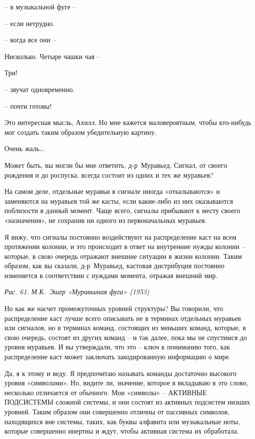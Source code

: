 \documentclass[../main.tex]{subfiles}
\begin{document}
\begin{dialogue}
 \--- в музыкальной фуге \---

 \--- если нетрудно.

 \--- когда все они \---

 Нисколько. Четыре чашки чая \---

 Три!

 \--- звучат одновременно.

 \--- почти готовы!

 Это интересная мысль, Ахилл. Но мне кажется маловероятным, чтобы кто-нибудь мог создать таким образом убедительную картину.

 Очень жаль\ldots{}

 Может быть, вы могли бы мне ответить, д-р~Муравьед. Сигнал, от своего рождения и до роспуска, всегда состоит из одних и тех же муравьев?

 На самом деле, отдельные муравьи в сигнале иногда «откалываются» и заменяются на муравьев той же касты, если какие-либо из них оказываются поблизости в данный момент. Чаще всего, сигналы прибывают к месту своего «назначения», не сохранив ни одного из первоначальных муравьев.

 Я вижу, что сигналы постоянно воздействуют на распределение каст на всем протяжении колонии, и это происходит в ответ на внутренние нужды колонии \--- которые, в свою очередь отражают внешние ситуации в жизни колонии. Таким образом, как вы сказали, д-р~Муравьед, кастовая дистрибуция постоянно изменяется в соответствии с нуждами момента, отражая внешний мир.

\emph{Рис. 61. М.К.~Эшер «Муравьиная фуга» (1953)}

 Но как же насчет промежуточных уровней структуры? Вы говорили, что распределение каст лучше всего описывать не в терминах отдельных муравьев или сигналов, но в терминах команд, состоящих из меньших команд, которые, в свою очередь, состоят из других команд \--- и так далее, пока мы не спустимся до уровня муравьев. И вы утверждали, что это \--- ключ к пониманию того, как распределение каст может заключать закодированную информацию о мире.

 Да, я к этому и веду. Я предпочитаю называть команды достаточно высокого уровня «символами». Но, видите ли, значение, которое я вкладываю в это слово, несколько отличается от обычного. Мои «символы» \--- АКТИВНЫЕ ПОДСИСТЕМЫ сложной системы, и они состоят из активных подсистем низших уровней. Таким образом они совершенно отличны от пассивных символов, находящихся вне системы, таких, как буквы алфавита или музыкальные ноты, которые совершенно инертны и ждут, чтобы активная система их обработала.


\end{dialogue}
\end{document}
